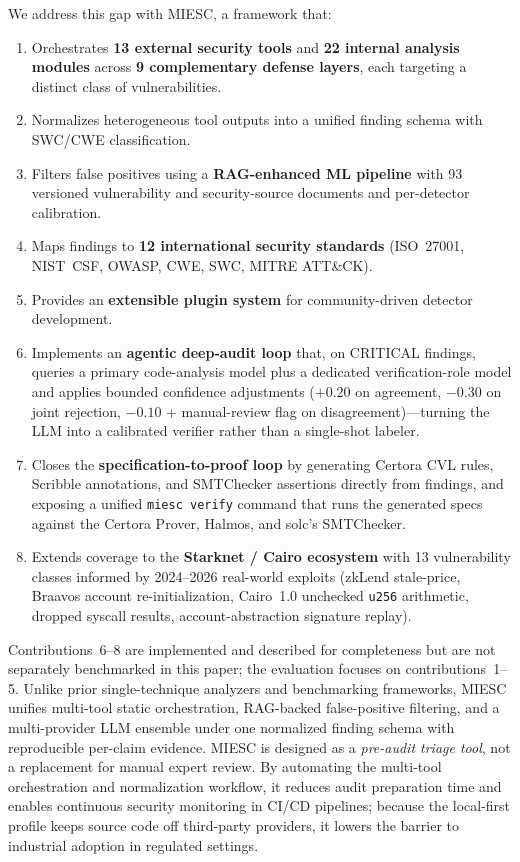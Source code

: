 \documentclass[conference]{IEEEtran}
\begin{document}
We address this gap with MIESC, a framework that:
\begin{enumerate}
    \item Orchestrates \textbf{13 external security tools} and \textbf{22 internal analysis modules} across \textbf{9 complementary defense layers}, each targeting a distinct class of vulnerabilities.
    \item Normalizes heterogeneous tool outputs into a unified finding schema with SWC/CWE classification.
    \item Filters false positives using a \textbf{RAG-enhanced ML pipeline} with 93 versioned vulnerability and security-source documents and per-detector calibration.
    \item Maps findings to \textbf{12 international security standards} (ISO~27001, NIST~CSF, OWASP, CWE, SWC, MITRE ATT\&CK).
    \item Provides an \textbf{extensible plugin system} for community-driven detector development.
    \item Implements an \textbf{agentic deep-audit loop} that, on CRITICAL findings, queries a primary code-analysis model plus a dedicated verification-role model and applies bounded confidence adjustments ($+0.20$ on agreement, $-0.30$ on joint rejection, $-0.10$ + manual-review flag on disagreement)---turning the LLM into a calibrated verifier rather than a single-shot labeler.
    \item Closes the \textbf{specification-to-proof loop} by generating Certora CVL rules, Scribble annotations, and SMTChecker assertions directly from findings, and exposing a unified \texttt{miesc verify} command that runs the generated specs against the Certora Prover, Halmos, and solc's SMTChecker.
    \item Extends coverage to the \textbf{Starknet / Cairo ecosystem} with 13 vulnerability classes informed by 2024--2026 real-world exploits (zkLend stale-price, Braavos account re-initialization, Cairo~1.0 unchecked \texttt{u256} arithmetic, dropped syscall results, account-abstraction signature replay).
\end{enumerate}

Contributions~6--8 are implemented and described for completeness but are not separately benchmarked in this paper; the evaluation focuses on contributions~1--5. Unlike prior single-technique analyzers and benchmarking frameworks, MIESC unifies multi-tool static orchestration, RAG-backed false-positive filtering, and a multi-provider LLM ensemble under one normalized finding schema with reproducible per-claim evidence. MIESC is designed as a \emph{pre-audit triage tool}, not a replacement for manual expert review. By automating the multi-tool orchestration and normalization workflow, it reduces audit preparation time and enables continuous security monitoring in CI/CD pipelines; because the local-first profile keeps source code off third-party providers, it lowers the barrier to industrial adoption in regulated settings.
\end{document}
